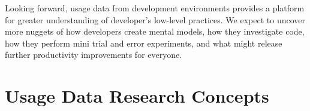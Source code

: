\documentclass{book}
\begin{document}
Looking forward, usage data from development environments provides a platform for greater understanding of developer's low-level practices.  We expect to uncover more nuggets of how developers create mental models, how they investigate code, how they perform mini trial and error experiments, and what might release further productivity improvements for everyone.

\section{Usage Data Research Concepts}





%


\pagebreak
\end{document}
